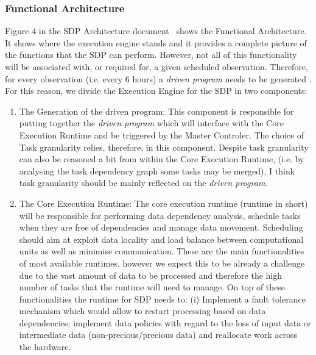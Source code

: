 \subsubsection{Functional Architecture}
Figure 4 in the SDP Architecture document~\cite{SDParch} shows the Functional Architecture. It shows where the execution engine stands and it provides a complete picture of the functions that the SDP can perform. However, not all of this functionality will be associated with, or required for, a given scheduled observation. Therefore, for every observation (i.e. every 6 hours) a \emph{driven program} needs to be generated
. For this reason, we divide the Execution Engine for the SDP in two components:
\begin{enumerate}
\item The Generation of the driven program: This component is responsible for putting together the \emph{driven program} which will interface with the Core Execution Runtime and  be triggered by the Master Controler. The choice of Task granularity relies, therefore, in this component. Despite task granularity can also be reasoned a bit from within the Core Execution Runtime, (i.e. by analysing the task dependency graph some tasks may be merged), I think task granularity should be mainly reflected on the \emph{driven program}. 
\item The Core Execution Runtime:  The core execution runtime (runtime in short) will be responsible for performing data dependency analysis, schedule tasks when they are free of dependencies and manage data movement. Scheduling should aim at exploit data locality and load balance between computational units as well as minimise communication. These are the main functionalities of most available runtimes, however we expect this to be already a challenge due to the vast amount of data to be processed and therefore the high number of tasks that the runtime will need to manage. On top of these functionalities the runtime for SDP needs to: (i) Implement a fault tolerance mechanism which would allow to restart processing based on data dependencies; implement data policies with regard to the loss of input data or intermediate data (non-precious/precious data) and reallocate work across the hardware. 
\end{enumerate}


